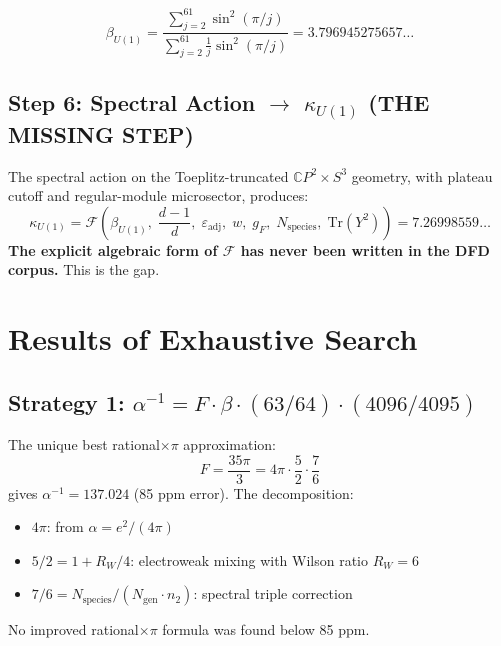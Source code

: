 \documentclass[11pt,a4paper]{article}
\theoremstyle{definition}
\begin{document}
\begin{equation}\label{eq:beta}
\beta_{U(1)} = \frac{\sum_{j=2}^{61}\sin^2(\pi/j)}
               {\sum_{j=2}^{61}\frac{1}{j}\sin^2(\pi/j)}
= 3.796945275657\ldots
\end{equation}

\subsection{Step 6: Spectral Action $\to$ $\kappa_{U(1)}$ (THE MISSING STEP)}

The spectral action on the Toeplitz-truncated $\mathbb{C}P^2 \times S^3$
geometry, with plateau cutoff and regular-module microsector, produces:
\begin{equation}
\kappa_{U(1)} = \mathcal{F}\!\left(\beta_{U(1)},\; \frac{d{-}1}{d},\;
\varepsilon_{\mathrm{adj}},\; w,\; g_F,\; N_{\mathrm{species}},\;
\mathrm{Tr}(Y^2)\right) = 7.26998559\ldots
\end{equation}
\textbf{The explicit algebraic form of $\mathcal{F}$ has never been written
in the DFD corpus.}  This is the gap.

\section{Results of Exhaustive Search}

\subsection{Strategy 1: $\alpha^{-1} = F \cdot \beta \cdot (63/64) \cdot (4096/4095)$}

The unique best rational$\times\pi$ approximation:
\begin{equation}
F = \frac{35\pi}{3} = 4\pi \cdot \frac{5}{2} \cdot \frac{7}{6}
\end{equation}
gives $\alpha^{-1} = 137.024$ (85 ppm error).  The decomposition:
\begin{itemize}
\item $4\pi$: from $\alpha = e^2/(4\pi)$
\item $5/2 = 1 + R_W/4$: electroweak mixing with Wilson ratio $R_W = 6$
\item $7/6 = N_{\mathrm{species}}/(N_{\mathrm{gen}} \cdot n_2)$:
spectral triple correction
\end{itemize}
No improved rational$\times\pi$ formula was found below 85 ppm.
\end{document}
